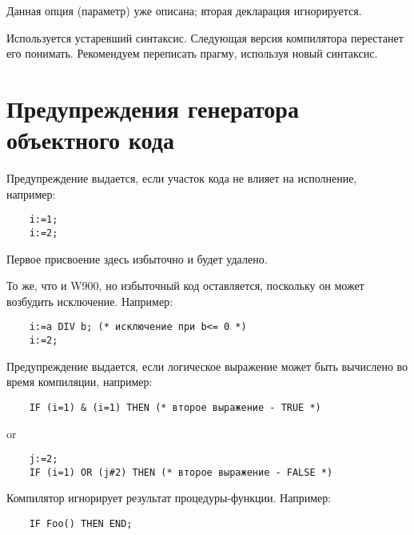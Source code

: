 Данная опция (параметр) уже описана; вторая декларация игнорируется.


Используется устаревший синтаксис. Следующая версия 
компилятора перестанет его понимать. Рекомендуем переписать
прагму, используя новый синтаксис.

\section{Предупреждения генератора объектного кода}


Предупреждение выдается, если участок кода не влияет на исполнение,
например:

\verb'    i:=1;'\\
\verb'    i:=2;'

Первое присвоение здесь избыточно и будет удалено.


То же, что и W900, но избыточный код оставляется, поскольку он
может возбудить исключение. Например:

\verb'    i:=a DIV b; (* исключение при b<= 0 *)'\\
\verb'    i:=2;'


Предупреждение выдается, если логическое выражение может быть вычислено
во время компиляции, например:

\verb'    IF (i=1) & (i=1) THEN (* второе выражение - TRUE *)'

or

\verb'    j:=2;'\\
\verb'    IF (i=1) OR (j#2) THEN (* второе выражение - FALSE *)'


Компилятор игнорирует результат процедуры-функции. Например:

\verb'    IF Foo() THEN END;'


